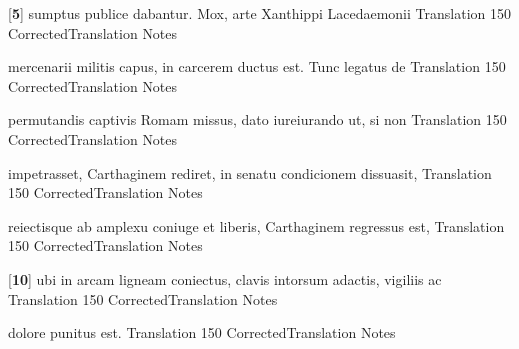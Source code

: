 \latline
  {[\textbf{5}] sumptus publice dabantur.  Mox, arte Xanthippi Lacedaemonii}
  { Translation }
  {150}
  { CorrectedTranslation }
  { Notes }


\latline
  {mercenarii militis capus, in carcerem ductus est.  Tunc legatus de}
  { Translation }
  {150}
  { CorrectedTranslation }
  { Notes }


\latline
  {permutandis captivis Romam missus, dato iureiurando ut, si non}
  { Translation }
  {150}
  { CorrectedTranslation }
  { Notes }


\latline
  {impetrasset, Carthaginem rediret, in senatu condicionem dissuasit,}
  { Translation }
  {150}
  { CorrectedTranslation }
  { Notes }


\latline
  {reiectisque ab amplexu coniuge et liberis, Carthaginem regressus est,}
  { Translation }
  {150}
  { CorrectedTranslation }
  { Notes }


\latline
  {[\textbf{10}] ubi in arcam ligneam coniectus, clavis intorsum adactis, vigiliis ac}
  { Translation }
  {150}
  { CorrectedTranslation }
  { Notes }


\latline
  {dolore punitus est.}
  { Translation }
  {150}
  { CorrectedTranslation }
  { Notes }



